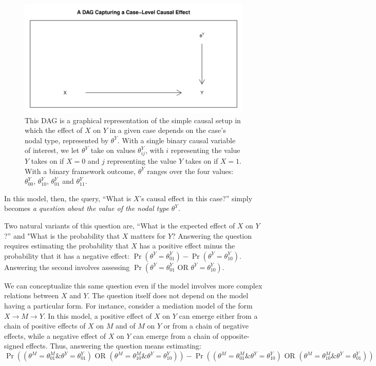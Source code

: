 \documentclass[
  12pt,
]{book}
\begin{document}
\begin{figure}

{\centering \includegraphics[width=0.6\linewidth]{ii_files/figure-latex/casequery-1} 

}

\caption{\label{fig:casequery} This DAG is a graphical representation of the simple causal setup in which the effect of $X$ on $Y$ in a given case depends on the case's nodal type, represented by $\theta^Y$. With a single binary causal variable of interest, we let $\theta^Y$ take on values $\theta^Y_{ij}$, with $i$ representing the value $Y$ takes on if $X=0$ and $j$ representing the value $Y$ takes on if $X=1$. With a binary framework outcome, $\theta^Y$ ranges over the four values: $\theta^Y_{00}$, $\theta^Y_{10}$, $\theta^Y_{01}$ and $\theta^Y_{11}$.}\label{fig:casequery}
\end{figure}

In this model, then, the query, ``What is \(X\)'s causal effect in this case?'' simply becomes \emph{a question about the value of the nodal type \(\theta^Y\)}.

Two natural variants of this question are, ``What is the expected effect of \(X\) on \(Y\)?'' and "What is the probability that \(X\) matters for \(Y\)? Answering the question requires estimating the probability that \(X\) has a positive effect minus the probability that it has a negative effect: \(\Pr(\theta^Y = \theta^Y_{01}) - \Pr(\theta^Y = \theta^Y_{10})\). Answering the second involves assessing \(\Pr(\theta^Y = \theta^Y_{01} \text{ OR } \theta^Y = \theta^Y_{10})\).

We can conceptualize this same question even if the model involves more complex relations between \(X\) and \(Y\). The question itself does not depend on the model having a particular form. For instance, consider a mediation model of the form \(X\rightarrow M \rightarrow Y\). In this model, a positive effect of \(X\) on \(Y\) can emerge either from a chain of positive effects of \(X\) on \(M\) and of \(M\) on \(Y\) or from a chain of negative effects, while a negative effect of \(X\) on \(Y\) can emerge from a chain of opposite-signed effects. Thus, answering the question means estimating:
\[\Pr((\theta^M = \theta^M_{01} \& \theta^Y = \theta^Y_{01})  \text{ OR }  (\theta^M = \theta^M_{10} \& \theta^Y = \theta^Y_{10}))   - \Pr((\theta^M = \theta^M_{01} \& \theta^Y = \theta^Y_{10})  \text{ OR }  (\theta^M = \theta^M_{10} \& \theta^Y = \theta^Y_{01}))\]
\end{document}
